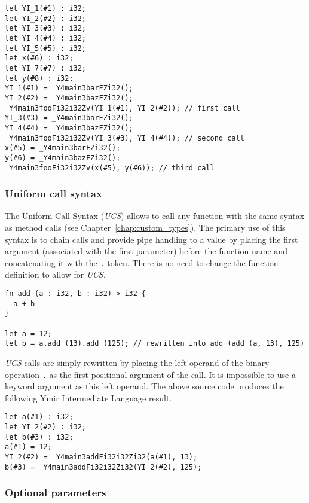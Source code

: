 \begin{lstlisting}[style=intermediateVerb]
let YI_1(#1) : i32;
let YI_2(#2) : i32;
let YI_3(#3) : i32;
let YI_4(#4) : i32;
let YI_5(#5) : i32;
let x(#6) : i32;
let YI_7(#7) : i32;
let y(#8) : i32;
YI_1(#1) = _Y4main3barFZi32();
YI_2(#2) = _Y4main3bazFZi32();
_Y4main3fooFi32i32Zv(YI_1(#1), YI_2(#2)); // first call
YI_3(#3) = _Y4main3barFZi32();
YI_4(#4) = _Y4main3bazFZi32();
_Y4main3fooFi32i32Zv(YI_3(#3), YI_4(#4)); // second call
x(#5) = _Y4main3barFZi32();
y(#6) = _Y4main3bazFZi32();
_Y4main3fooFi32i32Zv(x(#5), y(#6)); // third call
\end{lstlisting}

\subsubsection {Uniform call syntax}

The Uniform Call Syntax (\textit{UCS}) allows to call any function with the same
syntax as method calls (see Chapter~\ref{chap:custom_types}). The primary use of
this syntax is to chain calls and provide pipe handling to a value by placing
the first argument (associated with the first parameter) before the function
name and concatenating it with the \texttt{.} token. There is no need to change
the function definition to allow for \textit{UCS}.

\begin{lstlisting}[style=coloredverbatim]
fn add (a : i32, b : i32)-> i32 {
  a + b
}

let a = 12;
let b = a.add (13).add (125); // rewritten into add (add (a, 13), 125)
\end{lstlisting}

\textit{UCS} calls are simply rewritten by placing the left operand of the
binary operation \texttt{.} as the first positional argument of the call. It is
impossible to use a keyword argument as this left operand. The above source code
produces the following Ymir Intermediate Language result.

\begin{lstlisting}[style=intermediateVerb]
let a(#1) : i32;
let YI_2(#2) : i32;
let b(#3) : i32;
a(#1) = 12;
YI_2(#2) = _Y4main3addFi32i32Zi32(a(#1), 13);
b(#3) = _Y4main3addFi32i32Zi32(YI_2(#2), 125);
\end{lstlisting}

\subsubsection {Optional parameters}

